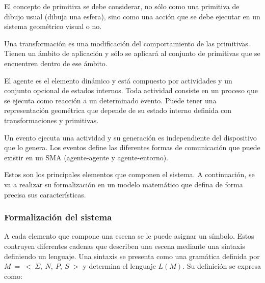 \documentclass[runningheads]{llncs}
\begin{document}
El concepto de primitiva se debe considerar, no s\'olo como una primitiva de dibujo usual (dibuja una esfera), sino como una acci\'on que se debe ejecutar en un sistema geom\'etrico visual o no. 

Una transformaci\'on es una modificaci\'on del comportamiento de las primitivas. Tienen un \'ambito de aplicaci\'on y s\'olo se aplicar\'a al conjunto de primitivas que se encuentren dentro de ese \'ambito.

El agente es el elemento din\'amico y est\'a compuesto por actividades y un conjunto opcional de estados internos. Toda actividad consiste en un proceso que se ejecuta como reacci\'on a un determinado evento. Puede tener una representaci\'on geom\'etrica que depende de su estado interno definida con transformaciones y primitivas.
	
Un evento ejecuta una actividad y su generaci\'on es independiente del dispositivo que lo genera. Los eventos define las diferentes formas de comunicaci\'on que puede existir en un SMA (agente-agente y agente-entorno).
	
Estos son los principales elementos que componen el sistema. A continuaci\'on, se va a realizar su formalizaci\'on en un modelo matem\'atico que defina de forma precisa sus caracter\'isticas.	

\subsubsection{Formalizaci\'on del sistema\label{sec:FormalizaciondelSistema}}

A cada elemento que compone una escena se le puede asignar un s\'imbolo. Estos contruyen diferentes cadenas que describen una escena mediante una sintaxis definiendo un lenguaje. Una sintaxis se presenta como una gram\'atica \cite{Davis1994} definida por $M~=~<~\Sigma,~N,~P,~S~>$ y determina el lenguaje $L(M)$. Su definici\'on se expresa como:
\end{document}
